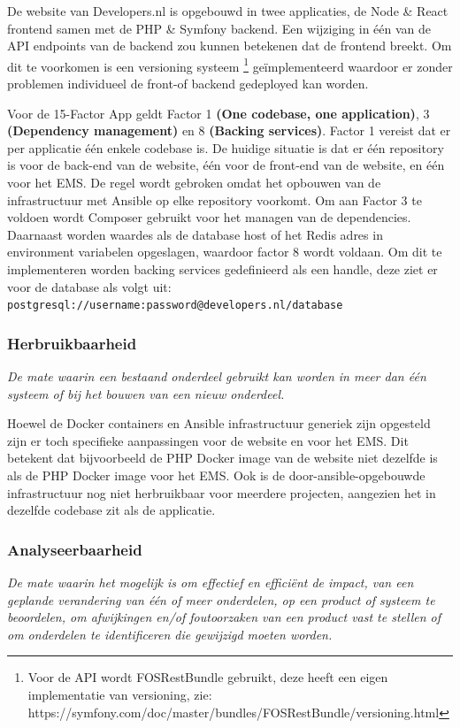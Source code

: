 De website van Developers.nl is opgebouwd in twee applicaties, de Node \& React frontend samen met de PHP \& Symfony backend. Een wijziging in één van de API endpoints van de backend zou kunnen betekenen dat de frontend breekt. Om dit te voorkomen is een versioning systeem \footnote{Voor de API wordt FOSRestBundle gebruikt, deze heeft een eigen implementatie van versioning, zie: https://symfony.com/doc/master/bundles/FOSRestBundle/versioning.html} geïmplementeerd waardoor er zonder problemen individueel de front-of backend gedeployed kan worden.

Voor de 15-Factor App geldt Factor 1 \textbf{(One codebase, one application)}, 3 \textbf{(Dependency management)} en 8 \textbf{(Backing services)}. Factor 1 vereist dat er per applicatie één enkele codebase is. De huidige situatie is dat er één repository is voor de back-end van de website, één voor de front-end van de website, en één voor het EMS. De regel wordt gebroken omdat het opbouwen van de infrastructuur met Ansible op elke repository voorkomt. Om aan Factor 3 te voldoen wordt Composer gebruikt voor het managen van de dependencies. Daarnaast worden waardes als de database host of het Redis adres in environment variabelen opgeslagen, waardoor factor 8 wordt voldaan. Om dit te implementeren worden backing services gedefinieerd als een handle, deze ziet er voor de database als volgt uit:\\ \texttt{postgresql://username:password@developers.nl/database}

\subsubsection{Herbruikbaarheid}
\textit{De mate waarin een bestaand onderdeel gebruikt kan worden in meer dan één systeem of bij het bouwen van een nieuw onderdeel.}

Hoewel de Docker containers en Ansible infrastructuur generiek zijn opgesteld zijn er toch specifieke aanpassingen voor de website en voor het EMS. Dit betekent dat bijvoorbeeld de PHP Docker image van de website niet dezelfde is als de PHP Docker image voor het EMS. Ook is de door-ansible-opgebouwde infrastructuur nog niet herbruikbaar voor meerdere projecten, aangezien het in dezelfde codebase zit als de applicatie.

\subsubsection{Analyseerbaarheid}
\textit{De mate waarin het mogelijk is om effectief en efficiënt de impact, van een geplande verandering van één of meer onderdelen, op een product of systeem te beoordelen, om afwijkingen en/of foutoorzaken van een product vast te stellen of om onderdelen te identificeren die gewijzigd moeten worden.}

